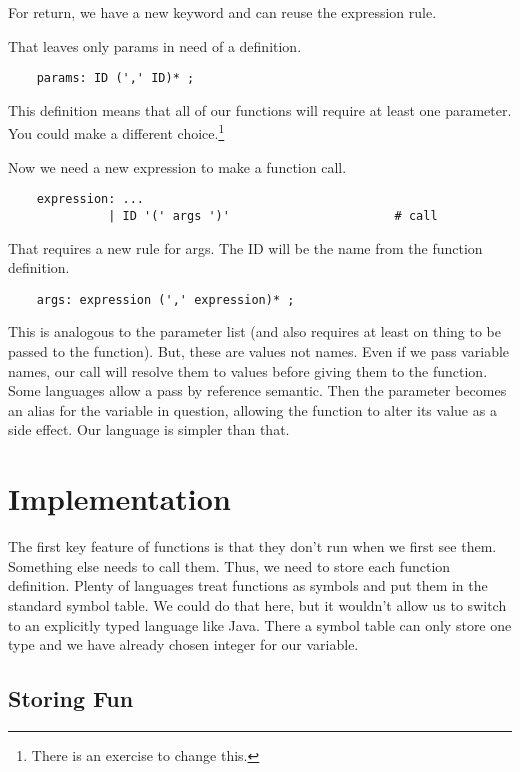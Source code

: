 For return, we have a new keyword and can reuse the expression rule.

That leaves only params in need of a definition.

{\footnotesize
\begin{verbatim}
    params: ID (',' ID)* ;
\end{verbatim}
}

This definition means that all of our functions will require at
least one parameter. You could make a different choice.\footnote{There
is an exercise to change this.}

Now we need a new expression to make a function call.

{\footnotesize
\begin{verbatim}
    expression: ...
              | ID '(' args ')'                       # call
\end{verbatim}
}

That requires a new rule for args. The ID will be the name from
the function definition.

{\footnotesize
\begin{verbatim}
    args: expression (',' expression)* ;
\end{verbatim}
}

This is analogous to the parameter list (and also requires at least
on thing to be passed to the function). But, these are values not names.
Even if we pass variable names, our call will resolve them to values
before giving them to the function. Some languages allow a pass by
reference semantic. Then the parameter becomes an alias for the variable
in question, allowing the function to alter its value as a side effect.
Our language is simpler than that.

\section{Implementation}

The first key feature of functions is that they don't run when we
first see them. Something else needs to call them. Thus, we need
to store each function definition. Plenty of languages treat functions
as symbols and put them in the standard symbol table. We could do that
here, but it wouldn't allow us to switch to an explicitly typed
language like Java. There a symbol table can only store one type and
we have already chosen integer for our variable.

\subsection{Storing Fun}


